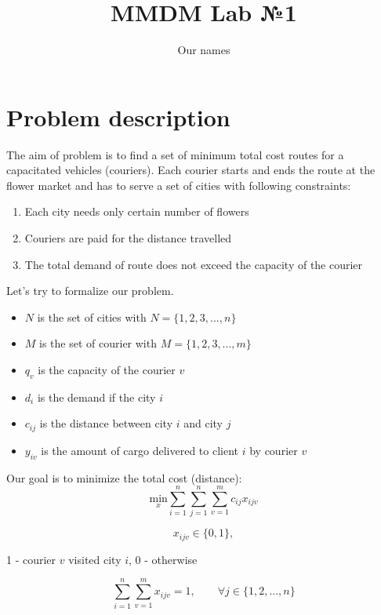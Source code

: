 \documentclass{article}
\title{MMDM Lab №1}
\author{Our names}
\begin{document}
\maketitle

\section{Problem description}
The aim of problem is to find a set of minimum total cost routes for a capacitated vehicles (couriers). Each courier starts and ends the route at the flower market and has to serve a set of cities with following constraints:
\begin{enumerate}
  \item Each city needs only certain number of flowers
  \item Couriers are paid for the distance travelled 
  \item The total demand of route does not exceed the capacity of the courier
\end{enumerate}
Let's try to formalize our problem. 
\begin{itemize}
  \item $N$ is the set of cities with $N = \{1,2,3,...,n\}$
  \item $M$ is the set of courier with $M = \{1,2,3,...,m\}$
  \item $q_v$ is the capacity of the courier $v$
  \item $d_i$ is the demand if the city $i$
  \item $c_{ij}$ is the distance between city $i$ and city $j$
  \item $y_{iv}$ is the amount of cargo delivered to client $i$ by courier $v$  
\end{itemize}

Our goal is to minimize the total cost (distance):
\begin{equation} \label{min}
\underset{x}{\text{min}}  \sum_{i=1}^{n}\sum_{j=1}^{n}\sum_{v=1}^{m} c_{ij}x_{ijv}
\end{equation}

\begin{equation} \label{x}
x_{ijv} \in \{0,1\}, 
\end{equation}
\begin{center}
   1 - courier  $v$ visited city $i$, 0 - otherwise 
\end{center}


\begin{equation} \label{3rd}
\sum_{i=1}^{n}\sum_{v=1}^{m} x_{ijv} = 1, \qquad \forall j \in \{1,2,...,n\}
\end{equation}
\end{document}

